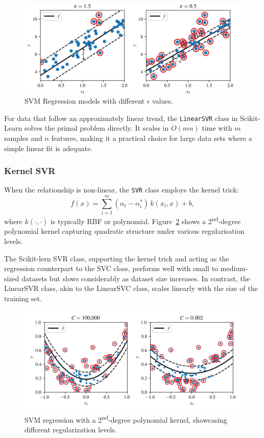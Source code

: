 \documentclass[12pt,letter]{article}
\begin{document}
\begin{figure}[H]
	\centering
	\includegraphics[width=6.5in]{../figures/SVM_Regression.png}
	\caption{SVM Regression models with different $\epsilon$ values.}
	\label{fig:SVM_Regression}
\end{figure}

For data that follow an approximately linear trend, the \texttt{LinearSVR} class in Scikit-Learn solves the primal problem directly. It scales in $O(mn)$ time with $m$ samples and $n$ features, making it a practical choice for large data sets where a simple linear fit is adequate.

\subsubsection{Kernel SVR}
\label{sec:svr-kernel}
When the relationship is non-linear, the \texttt{SVR} class employs the kernel trick:
\begin{equation}
f(x)=\sum_{i=1}^{m}(\alpha_i-\alpha_i^{\!*})\,k(x_i,x)+b,
\end{equation}
where $k(\cdot,\cdot)$ is typically RBF or polynomial.  Figure~\ref{fig:SVM_regression_2nd_degree} shows a 2\textsuperscript{nd}-degree polynomial kernel
capturing quadratic structure under various regularisation levels.

The Scikit-lern SVR class, supporting the kernel trick and acting as the regression counterpart to the SVC class, performs well with small to medium-sized datasets but slows considerably as dataset size increases. In contrast, the LinearSVR class, akin to the LinearSVC class, scales linearly with the size of the training set.

\begin{figure}[H]
	\centering
	\includegraphics[width=6.5in]{../figures/SVM_regression_2nd_degree.png}
	\caption{SVM regression with a 2\textsuperscript{nd}-degree polynomial kernel, showcasing different regularization levels.}
	\label{fig:SVM_regression_2nd_degree}
\end{figure}
\end{document}
